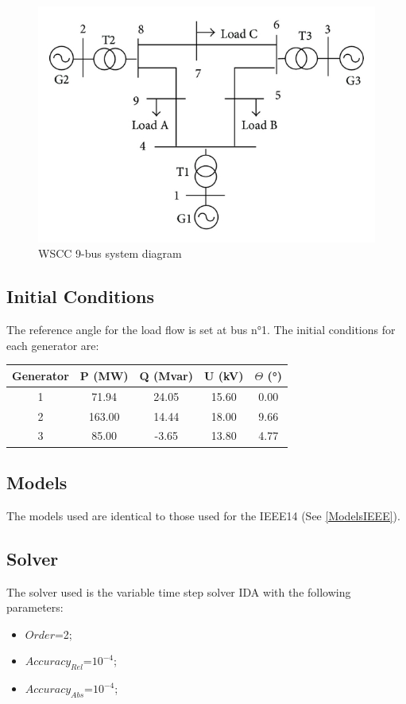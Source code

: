 \documentclass[a4paper, 12pt]{report}
\begin{document}
\begin{figure}[H]
  \includegraphics[width=\textwidth]{WSCC9Bus.jpg}
  \caption{WSCC 9-bus system diagram}
\end{figure}

\subsection{Initial Conditions}

The reference angle for the load flow is set at bus n°1. The initial conditions for each generator
are:
\begin{center}
\begin{tabular}{|c|c|c|c|c|}
  \hline
  Generator & P (MW) & Q (Mvar) & U (kV) & $\Theta$ (°) \\
  \hline
  1 & 71.94 & 24.05 & 15.60 & 0.00\\
  2 & 163.00 & 14.44 & 18.00 & 9.66\\
  3 & 85.00 & -3.65 & 13.80 & 4.77\\
  \hline
\end{tabular}
\end{center}

\subsection{Models}

The models used are identical to those used for the IEEE14 (See \ref{ModelsIEEE}).

\subsection{Solver}
The solver used is the variable time step solver IDA with the following parameters:
\begin{itemize}
\item $Order$=2;
\item $Accuracy_{Rel}$=$10^{-4}$;
\item $Accuracy_{Abs}$=$10^{-4}$;
\end{itemize}
\end{document}
